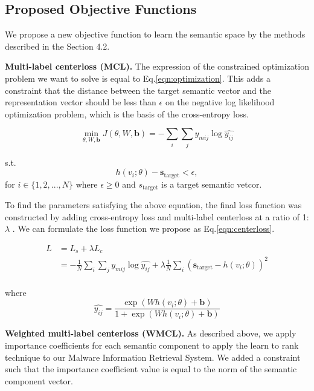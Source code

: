 \subsection{Proposed Objective Functions}
We propose a new objective function to learn the semantic space by the methods described in the Section 4.2.

\textbf{Multi-label centerloss (MCL). }
The expression of the constrained optimization problem we want to solve is equal to Eq.\ref{eqn:optimization}. This adds a constraint that the distance between the target semantic vector and the representation vector should be less than $\epsilon$ on the negative log likelihood optimization problem, which is the basis of the cross-entropy loss.



\begin{equation}
\label{eqn:optimization}
\min_{\theta, W, \mathbf{b}} J(\theta, W, \mathbf{b}) = -\sum_i{ \sum_j{ y_{mij} \log{\hat{y_{ij}}}}}
\end{equation}

s.t.
\[
h(v_i;\theta) - \mathbf{s}_\text{target} < \epsilon ,
\]
for $i \in \{1,2, ..., N\}$ where $\epsilon \geq 0$ and $s_\text{target}$ is a target semantic vetcor.

To find the parameters satisfying the above equation, the final loss function was constructed by adding cross-entropy loss and multi-label centerloss at a ratio of 1:$\lambda$ \cite{wen2016discriminative}. We can formulate the loss function we propose as Eq.\ref{eqn:centerloss}. 

\begin{equation}
\label{eqn:centerloss}
\begin{aligned}
L &= L_s + \lambda L_c \\
 &= -\frac{1}{N}\sum_i{\sum_j{ y_{mij} \log{\hat{y_{ij}}}}} 
+ \lambda \frac{1}{N} \sum_i{( \mathbf{s}_{\text{target}} - h(v_i;\theta))^2}\\
\end{aligned}
\end{equation}

where 
\[
\hat{y_{ij}} = \frac{\exp(Wh(v_i;\theta)+\mathbf{b})}{ 1 + \exp(Wh(v_i;\theta)+\mathbf{b})}
\]


  
\textbf{Weighted multi-label centerloss (WMCL). }
As described above, we apply importance coefficients for each semantic component to apply the learn to rank technique to our Malware Information Retrieval System. We added a constraint such that the importance coefficient value is equal to the norm of the semantic component vector. 

